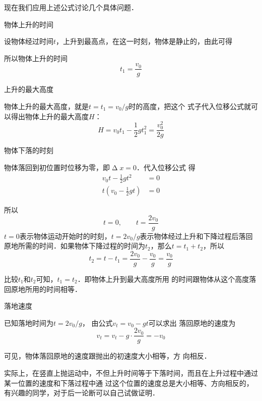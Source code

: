 现在我们应用上述公式讨论几个具体问题．
\begin{QsNum}
    \item 物体上升的时间

          设物体经过时间$t$，上升到最高点，在这一时刻，物体是静止的，由此可得

          所以物体上升的时间
          \[t_1=\frac{v_0}{g} \]

    \item 上升的最大高度

          物体上升的最大高度，就是$t=t_1=v_0/g$时的高度，把这个
          式子代入位移公式就可以得出物体上升的最大高度$H$：
          \[H=v_0t_1-\frac{1}{2}gt_1^2=\frac{v^2_0}{2g} \]

    \item 物体下落的时刻

          物体落回到初位置时位移为零，即$\upDelta x=0$．代入位移公式
          得
          \begin{equation*}
              \begin{aligned}
                  v_0 t-\frac{1}{2}gt^2           & =0 \\
                  t\left(v_0-\frac{1}{2}gt\right) & =0
              \end{aligned}
          \end{equation*}

          所以
          \[t=0,\qquad t=\frac{2v_0}{g} \]
          $t=0$表示物体运动开始时的时刻，$t=2v_0/g$表示物体经过上升和下降过程后落回原地所需的时间．如果物体下降过程的时间为$t_2$，那么$t=t_1+t_2$，所以
          \[t_2=t-t_1=\frac{2v_0}{g}-\frac{v_0}{g}=\frac{v_0}{g} \]

          比较$t_1$和$t_2$可知，$t_1=t_2$．即物体上升到最大高度所用
          的时间跟物体从这个高度落回原地所用的时间相等．

    \item 落地速度

          已知落地时间为$t=2v_0/g$，
          由公式$v_t=v_0-gt$可以求出
          落回原地的速度为
          \[v_t=v_t-g\cdot \frac{2v_0}{g}=-v_0 \]

          可见，物体落回原地的速度跟抛出的初速度大小相等，方
          向相反．
\end{QsNum}

实际上，在竖直上抛运动中，不但上升时间等于下落时间，而且在上升过程中通过某一位置的速度和下落过程中通
过这个位置的速度总是大小相等、方向相反的，有兴趣的同学，对于后一论断可以自己试做证明．

